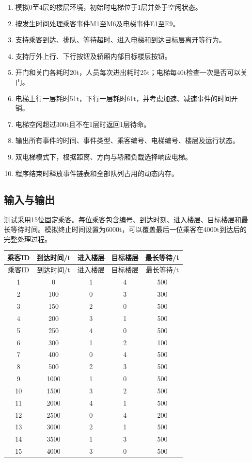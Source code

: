 \documentclass[UTF8,a4paper,12pt]{ctexart}
\begin{document}
\begin{enumerate}[label=\arabic*.]
    \item 模拟0至4层的楼层环境，初始时电梯位于1层并处于空闲状态。
    \item 按发生时间处理乘客事件M1至M6及电梯事件E1至E9。
    \item 支持乘客到达、排队、等待超时、进入电梯和到达目标层离开等行为。
    \item 支持厅外上行、下行按钮及轿厢内部目标楼层按钮。
    \item 开门和关门各耗时20t，人员每次进出耗时25t；电梯每40t检查一次是否可以关门。
    \item 电梯上行一层耗时51t，下行一层耗时61t，并考虑加速、减速事件的时间开销。
    \item 电梯空闲超过300t且不在1层时返回1层待命。
    \item 输出所有事件的时间、事件类型、乘客编号、电梯编号、楼层及运行状态。
    \item 双电梯模式下，根据距离、方向与轿厢负载选择响应电梯。
    \item 程序结束时释放事件链表和全部队列占用的动态内存。
\end{enumerate}

\subsection{输入与输出}

测试采用15位固定乘客。每位乘客包含编号、到达时刻、进入楼层、目标楼层和最长等待时间。模拟终止时间设置为6000t，可以覆盖最后一位乘客在4000t到达后的完整处理过程。

\begin{longtable}{ccccc}
\toprule
乘客ID & 到达时间/t & 进入楼层 & 目标楼层 & 最长等待/t\\
\midrule
\endfirsthead
\toprule
乘客ID & 到达时间/t & 进入楼层 & 目标楼层 & 最长等待/t\\
\midrule
\endhead
1&0&1&4&500\\
2&100&0&3&300\\
3&150&2&0&500\\
4&200&3&1&500\\
5&250&4&0&500\\
6&300&1&2&100\\
7&400&0&4&500\\
8&500&2&3&500\\
9&1000&1&0&500\\
10&1500&3&2&500\\
11&2000&4&1&500\\
12&2500&0&4&200\\
13&3000&2&1&500\\
14&3500&1&3&500\\
15&4000&3&0&500\\
\bottomrule
\end{longtable}
\end{document}
